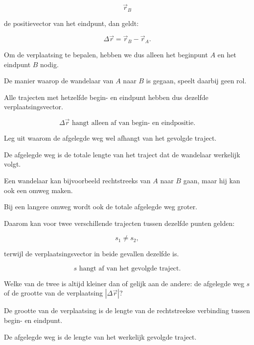 \documentclass{ximera}
\begin{document}
\begin{oefening}{\oefU\ESS}
\begin{question}
\begin{oplossing}
  \[
  \vec{r}_B
  \]
  
  de positievector van het eindpunt, dan geldt:
  
  \[
  \Delta \vec{r}
  =
  \vec{r}_B-\vec{r}_A.
  \]
  
  Om de verplaatsing te bepalen, hebben we dus alleen het beginpunt $A$ en
  het eindpunt $B$ nodig.
  
  De manier waarop de wandelaar van $A$ naar $B$ is gegaan, speelt daarbij
  geen rol.
  
  Alle trajecten met hetzelfde begin- en eindpunt hebben dus dezelfde
  verplaatsingsvector.
  
  \[
  \boxed{
  \Delta\vec{r}
  \text{ hangt alleen af van begin- en eindpositie.}
  }
  \]
  \end{oplossing}
  \end{question}
  
  
  \begin{question}
  Leg uit waarom de afgelegde weg wel afhangt van het gevolgde traject.
  
  \begin{oplossing}
  De afgelegde weg is de totale lengte van het traject dat de wandelaar
  werkelijk volgt.
  
  Een wandelaar kan bijvoorbeeld rechtstreeks van $A$ naar $B$ gaan, maar hij
  kan ook een omweg maken.
  
  Bij een langere omweg wordt ook de totale afgelegde weg groter.
  
  Daarom kan voor twee verschillende trajecten tussen dezelfde punten gelden:
  
  \[
  s_1 \neq s_2,
  \]
  
  terwijl de verplaatsingsvector in beide gevallen dezelfde is.
  
  \[
  \boxed{
  s \text{ hangt af van het gevolgde traject.}
  }
  \]
  \end{oplossing}
  \end{question}
  
  
  \begin{question}
  Welke van de twee is altijd kleiner dan of gelijk aan de andere:
  de afgelegde weg $s$ of de grootte van de verplaatsing
  $|\Delta\vec{r}|$?
  
  \begin{oplossing}
  De grootte van de verplaatsing is de lengte van de rechtstreekse verbinding
  tussen begin- en eindpunt.
  
  De afgelegde weg is de lengte van het werkelijk gevolgde traject.
  

\end{oplossing}
\end{question}
\end{oefening}
\end{document}

